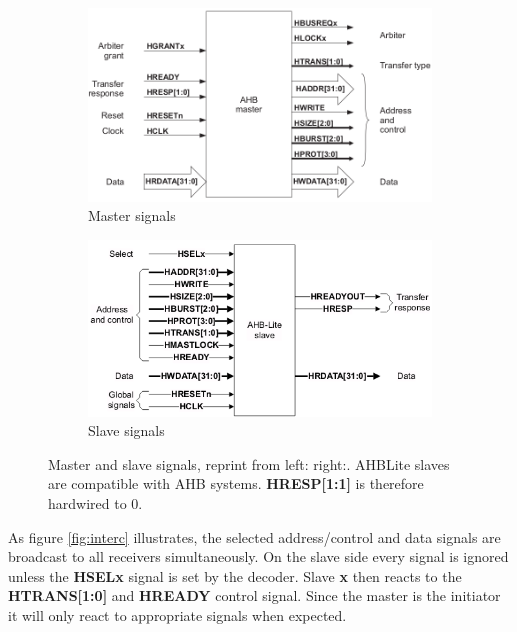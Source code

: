 \newpage

\begin{figure}[hbt]
 \centering
 \begin{subfigure}[b]{0.4\linewidth}
 \includegraphics[width=\linewidth]{figs/AHB/master_signals.png}
 \caption{Master signals}
 \end{subfigure}
 \begin{subfigure}[b]{0.4\linewidth}
 \includegraphics[width=\linewidth]{figs/AHB/slave_lite.png}
 \caption{Slave signals}
 \end{subfigure}
 \caption{Master and slave signals, reprint from left:\cite{amba} right:\cite{amba3}. AHBLite slaves are compatible with AHB systems\cite{ambacomp}. \textbf{HRESP[1:1]} is therefore hardwired to 0.}
 \label{fig:ahbsig}
\end{figure}


As figure \ref{fig:interc} illustrates, the selected address/control and data signals are broadcast to all receivers simultaneously. On the slave side every signal is ignored unless the \textbf{HSELx} signal is set by the decoder. Slave \textbf{x} then reacts to the \textbf{HTRANS[1:0]} and \textbf{HREADY} control signal. Since the master is the initiator it will only react to appropriate signals when expected. \\

